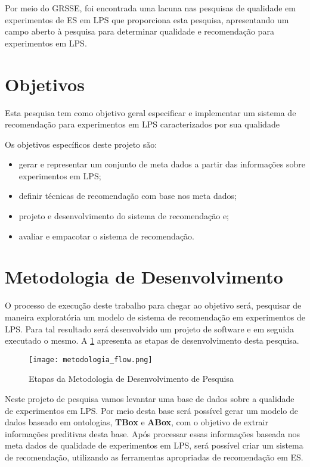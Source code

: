 Por meio do GRSSE, foi encontrada uma lacuna nas pesquisas de qualidade em experimentos de ES em LPS que proporciona esta pesquisa, apresentando um campo aberto à pesquisa para determinar qualidade e recomendação para experimentos em LPS.

\section{Objetivos}
\label{sec:objetivos}

Esta pesquisa tem como objetivo geral especificar e implementar um sistema de recomendação para experimentos em LPS caracterizados por sua qualidade

Os objetivos específicos deste projeto são:

\begin{itemize}
	\item gerar e representar um conjunto de meta dados a partir das informações sobre experimentos em LPS;
	\item definir técnicas de recomendação com base nos meta dados;
	\item projeto e desenvolvimento do sistema de recomendação e;
	\item avaliar e empacotar o sistema de recomendação.
\end{itemize}


\section{Metodologia de Desenvolvimento}
\label{sec:metodologia}

O processo de execução deste trabalho para chegar ao objetivo será, pesquisar de maneira exploratória um modelo de sistema de recomendação em experimentos de LPS. Para tal resultado será desenvolvido um projeto de software e em seguida executado o mesmo. A \ref{fig:metodologia_flow} apresenta as etapas de desenvolvimento desta pesquisa.

\begin{figure}[htb]
	\centering					
	{\texttt{[image: metodologia\_flow.png]}}
	
	\caption{Etapas da Metodologia de Desenvolvimento de Pesquisa}
	\label{fig:metodologia_flow}
\end{figure}

Neste projeto de pesquisa vamos levantar uma base de dados sobre a qualidade de experimentos em LPS. Por meio desta base será possível gerar um modelo de dados baseado em ontologias, \textbf{TBox} e \textbf{ABox}, com o objetivo de extrair informações preditivas desta base. Após processar essas informações baseada nos meta dados de qualidade de experimentos em LPS, será possível criar um sistema de recomendação, utilizando as ferramentas apropriadas de recomendação em ES.

